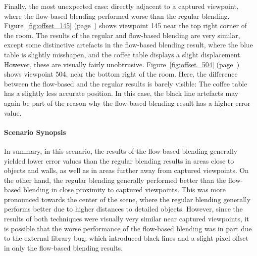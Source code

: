 Finally, the most unexpected case: directly adjacent to a captured viewpoint, where the flow-based blending performed worse than the regular blending. Figure~\ref{fig:offset_145} (page~\pageref{fig:offset_145}) shows viewpoint 145 near the top right corner of the room. The results of the regular and flow-based blending are very similar, except some distinctive artefacts in the flow-based blending result, where the blue table is slightly misshapen, and the coffee table displays a slight displacement. However, these are visually fairly unobtrusive.
Figure~\ref{fig:offset_504} (page~\pageref{fig:offset_504}) shows viewpoint 504, near the bottom right of the room. Here, the difference between the flow-based and the regular results is barely visible: The coffee table has a slightly less accurate position. In this case, the black line artefacts may again be part of the reason why the flow-based blending result has a higher error value.


\paragraph{Scenario Synopsis}
In summary, in this scenario, the results of the flow-based blending generally yielded lower error values than the regular blending results in areas close to objects and walls, as well as in areas further away from captured viewpoints.
On the other hand, the regular blending generally performed better than the flow-based blending in close proximity to captured viewpoints. This was more pronounced towards the center of the scene, where the regular blending generally performs better due to higher distances to detailed objects. However, since the results of both techniques were visually very similar near captured viewpoints, it is possible that the worse performance of the flow-based blending was in part due to the external library bug, which introduced black lines and a slight pixel offset in only the flow-based blending results.


